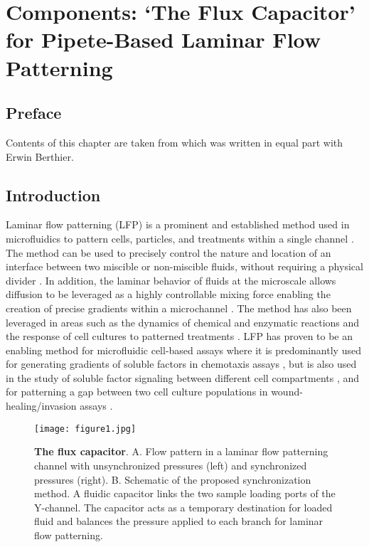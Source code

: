 \chapter{Components: `The Flux Capacitor' for Pipete-Based Laminar Flow Patterning}

\section{Preface}
Contents of this chapter are taken from \cite{Berthier:2011fk} which was written in equal part with Erwin Berthier.

\section{Introduction}
Laminar flow patterning (LFP) is a prominent and established method used in microfluidics to pattern cells, particles, and treatments within a single channel \cite{Takayama:1999qf}. The method can be used to precisely control the nature and location of an interface between two miscible or non-miscible fluids, without requiring a physical divider \cite{Lucchetta:2005kn}. In addition, the laminar behavior of fluids at the microscale allows diffusion to be leveraged as a highly controllable mixing force enabling the creation of precise gradients within a microchannel \cite{Sia:2003bh}. The method has also been leveraged in areas such as the dynamics of chemical and enzymatic reactions \cite{Regenberg:2004ly} and the response of cell cultures to patterned treatments \cite{Tourovskaia2005Differentiation}. LFP has proven to be an enabling method for microfluidic cell-based assays where it is predominantly used for generating gradients of soluble factors in chemotaxis assays \cite{Li-Jeon:2002uz}, but is also used in the study of soluble factor signaling between different cell compartments \cite{Torisawa:2009bh,Sung:2010fk}, and for patterning a gap between two cell culture populations in wound-healing/invasion assays \cite{Wong:2008lq}.

\begin{figure}[!b]
\centering
  \texttt{[image: figure1.jpg]}
  \caption{\textbf{The flux capacitor}. A. Flow pattern in a laminar flow patterning channel with unsynchronized pressures (left) and synchronized pressures (right). B. Schematic of the proposed synchronization method. A fluidic capacitor links the two sample loading ports of the Y-channel. The capacitor acts as a temporary destination for loaded fluid and balances the pressure applied to each branch for laminar flow patterning.}
  \label{fig:scematic}
\end{figure}

